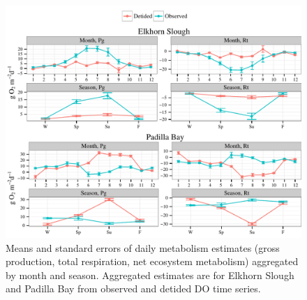 \documentclass[letterpaper,12pt,oneside]{article}\usepackage[]{graphicx}\usepackage[]{color}
\makeatletter
\def\maxwidth{ %
  \ifdim\Gin@nat@width>\linewidth
    \linewidth
  \else
    \Gin@nat@width
  \fi
}
\newenvironment{knitrout}{}{} %
\makeatother
\begin{document}
\centering\vspace*{\fill}
\begin{knitrout}
\color{fgcolor}\begin{figure}[!ht]


{\centering \includegraphics[width=\maxwidth]{figure/metab_sum1} 

}

\caption[Means and standard errors of daily metabolism estimates (gross production, total respiration, net ecosystem metabolism) aggregated by month and season]{Means and standard errors of daily metabolism estimates (gross production, total respiration, net ecosystem metabolism) aggregated by month and season.  Aggregated estimates are for Elkhorn Slough and Padilla Bay from observed and detided \ac{DO} time series.\label{fig:metab_sum1}}
\end{figure}


\end{knitrout}
\vfill
\clearpage
\end{document}
